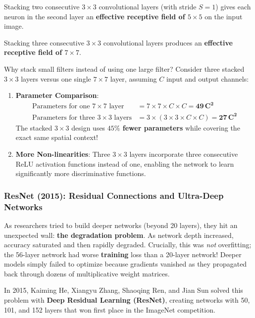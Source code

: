 \begin{keyidea}
Stacking two consecutive $3 \times 3$ convolutional layers (with stride $S=1$) gives each neuron in the second layer an \textbf{effective receptive field of $5 \times 5$} on the input image. 

Stacking three consecutive $3 \times 3$ convolutional layers produces an \textbf{effective receptive field of $7 \times 7$}.
\end{keyidea}

Why stack small filters instead of using one large filter? Consider three stacked $3 \times 3$ layers versus one single $7 \times 7$ layer, assuming $C$ input and output channels:
\begin{enumerate}
    \item \textbf{Parameter Comparison}:
    \begin{align*}
    \text{Parameters for one } 7 \times 7 \text{ layer} &= 7 \times 7 \times C \times C = \mathbf{49\,C^2} \\
    \text{Parameters for three } 3 \times 3 \text{ layers} &= 3 \times (3 \times 3 \times C \times C) = \mathbf{27\,C^2}
    \end{align*}
    The stacked $3 \times 3$ design uses \textbf{$45\%$ fewer parameters} while covering the exact same spatial context!
    \item \textbf{More Non-linearities}: Three $3 \times 3$ layers incorporate three consecutive ReLU activation functions instead of one, enabling the network to learn significantly more discriminative functions.
\end{enumerate}

\subsubsection{ResNet (2015): Residual Connections and Ultra-Deep Networks}
As researchers tried to build deeper networks (beyond 20 layers), they hit an unexpected wall: \textbf{the degradation problem}. As network depth increased, accuracy saturated and then rapidly degraded. Crucially, this was \emph{not} overfitting; the 56-layer network had worse \textbf{training} loss than a 20-layer network! Deeper models simply failed to optimize because gradients vanished as they propagated back through dozens of multiplicative weight matrices.

In 2015, Kaiming He, Xiangyu Zhang, Shaoqing Ren, and Jian Sun solved this problem with \textbf{Deep Residual Learning (ResNet)}, creating networks with 50, 101, and 152 layers that won first place in the ImageNet competition.

